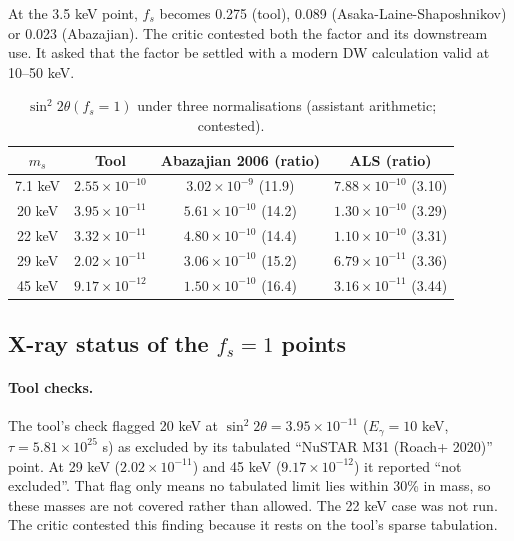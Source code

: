 \documentclass[11pt,a4paper]{article}
\begin{document}
At the 3.5 keV point, $f_s$ becomes 0.275 (tool), 0.089 (Asaka-Laine-Shaposhnikov) or 0.023 (Abazajian). The critic contested both the factor and its downstream use. It asked that the factor be settled with a modern DW calculation valid at 10--50 keV.

\begin{table}[h]
\centering
\begin{tabular}{cccc}
\toprule
$m_s$ & Tool & Abazajian 2006 (ratio) & ALS (ratio) \\
\midrule
7.1 keV & $2.55\times10^{-10}$ & $3.02\times10^{-9}$ (11.9) & $7.88\times10^{-10}$ (3.10) \\
20 keV & $3.95\times10^{-11}$ & $5.61\times10^{-10}$ (14.2) & $1.30\times10^{-10}$ (3.29) \\
22 keV & $3.32\times10^{-11}$ & $4.80\times10^{-10}$ (14.4) & $1.10\times10^{-10}$ (3.31) \\
29 keV & $2.02\times10^{-11}$ & $3.06\times10^{-10}$ (15.2) & $6.79\times10^{-11}$ (3.36) \\
45 keV & $9.17\times10^{-12}$ & $1.50\times10^{-10}$ (16.4) & $3.16\times10^{-11}$ (3.44) \\
\bottomrule
\end{tabular}
\caption{$\sin^2 2\theta(f_s=1)$ under three normalisations (assistant arithmetic; contested).}
\label{tab:norm}
\end{table}

\subsection{X-ray status of the $f_s=1$ points}
\paragraph{Tool checks.} The tool's check flagged 20 keV at $\sin^2 2\theta=3.95\times10^{-11}$ ($E_\gamma=10$ keV, $\tau=5.81\times10^{25}$ s) as excluded by its tabulated ``NuSTAR M31 (Roach+ 2020)'' point. At 29 keV ($2.02\times10^{-11}$) and 45 keV ($9.17\times10^{-12}$) it reported ``not excluded''. That flag only means no tabulated limit lies within 30\% in mass, so these masses are not covered rather than allowed. The 22 keV case was not run. The critic contested this finding because it rests on the tool's sparse tabulation.
\end{document}
